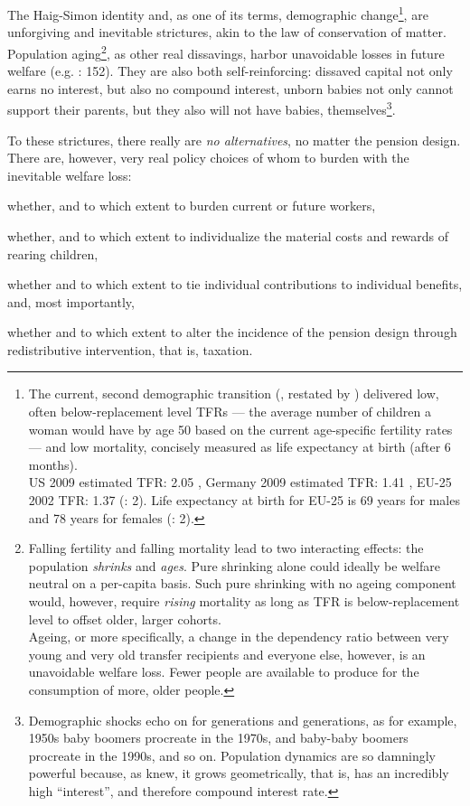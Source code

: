 \documentclass[11pt,a4paper,oneside,openright]{article}
\begin{document}
The Haig-Simon identity and, as one of its terms, demographic change\footnote{
	The current, second demographic transition (\citealt{Davis1945}, restated by \citealt{Caldwell-1976-aa}) delivered low, often below-replacement level \glspl{TFR} --- the average number of children a woman would have by age 50 based on the current age-specific fertility rates --- and low mortality, concisely measured as life expectancy at birth (after 6 months). \\ 
	US 2009 estimated TFR: 2.05 \citep{CIA2009}, Germany 2009 estimated TFR: 1.41 \citep{CIA2009}, EU-25 2002 TFR: 1.37 (\citealt{Demeny-2003-aa}: 2). 
	Life expectancy at birth for EU-25 is 69 years for males and 78 years for females (\citealt{Demeny-2003-aa}: 2).}, 
are unforgiving and inevitable strictures, akin to the law of conservation of matter. 
Population aging\footnote{
	Falling fertility and falling mortality lead to two interacting effects: 
	the population \emph{shrinks} and \emph{ages}. 
	Pure shrinking alone could ideally be welfare neutral on a per-capita basis. 
	Such pure shrinking with no ageing component would, however, require \emph{rising} mortality as long as TFR is below-replacement level to offset older, larger cohorts.\\
	Ageing, or more specifically, a change in the dependency ratio between very young and very old transfer recipients and everyone else, however, is an unavoidable welfare loss. 
	Fewer people are available to produce for the consumption of more, older people.},
as other real dissavings, harbor unavoidable losses in future welfare (e.g. \citealt{Borsch-Supan2003}: 152). 
They are also both self-reinforcing: 
dissaved capital not only earns no interest, but also no compound interest, unborn babies not only cannot support their parents, but they also will not have babies, themselves\footnote{
	Demographic shocks echo on for generations and generations, as for example, 1950s baby boomers procreate in the 1970s, and baby-baby boomers procreate in the 1990s, and so on. 
	Population dynamics are so damningly powerful because, as \cite{Malthus1798} knew, it grows geometrically, that is, has an incredibly high ``interest'', and therefore compound interest rate.}.

To these strictures, there really are \emph{no alternatives}, no matter the pension design. 
There are, however, very real policy choices of whom to burden with the inevitable welfare loss: 
\begin{inparaenum} \item whether, and to which extent to burden current or future workers, \item whether, and to which extent to individualize the material costs and rewards of rearing children, \item whether and to which extent to tie individual contributions to individual benefits, and, most importantly, \item whether and to which extent to alter the incidence of the pension design through redistributive intervention, that is, taxation. 
\end{inparaenum}
\end{document}
